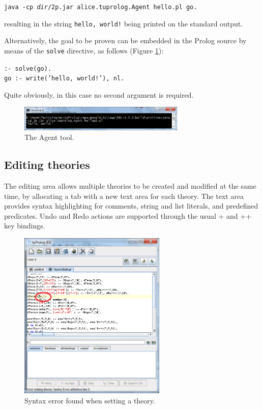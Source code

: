 \texttt{java -cp \textit{dir}/2p.jar alice.tuprolog.Agent hello.pl go.}

\noindent resulting in the string \texttt{hello, world!} being printed on the standard output.

\noindent Alternatively, the goal to be proven can be embedded in the Prolog source by means of the \texttt{solve} directive, as follows (Figure \ref{fig:tuprologAgent}):

\texttt{:- solve(go).}\\
\indent\texttt{go :- write('hello, world!'), nl.}

\noindent Quite obviously, in this case no second argument is required.

\begin{figure}
\centering
  \includegraphics[width=300px]{images/tuprologAgent.png}
  \caption{The \tuprolog{} Agent tool.}\label{fig:tuprologAgent}
\end{figure}

\subsection{Editing theories}
\label{sec:editing-theories}

The editing area allows multiple theories to be created and modified at the same time, by allocating a tab with a new text area for each theory.
%
The text area provides syntax highlighting for comments, string and list literals, and predefined predicates.
%
Undo and Redo actions are supported through the usual + and ++ key bindings.

\begin{figure}
\centering
\includegraphics[width=7cm]{images/syntaxErrorFound}
\caption{Syntax error found when setting a theory.}
\label{fig:syntax-error-found}
\end{figure}

